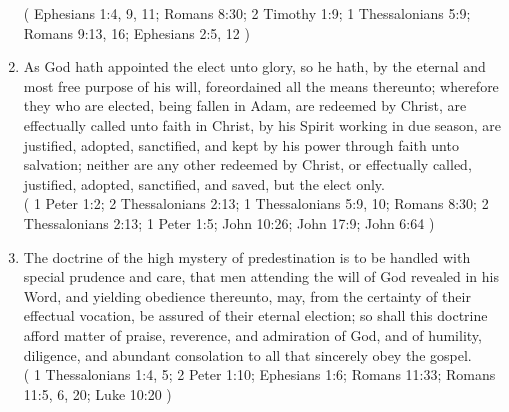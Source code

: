 \documentclass[12pt,a4paper]{book}
\begin{document}
\begin{enumerate}
( Ephesians 1:4, 9, 11; Romans 8:30; 2 Timothy 1:9; 1 Thessalonians 5:9; Romans 9:13, 16; Ephesians 2:5, 12 )
\item As God hath appointed the elect unto glory, so he hath, by the eternal and most free purpose of his will, foreordained all the means thereunto; wherefore they who are elected, being fallen in Adam, are redeemed by Christ, are effectually called unto faith in Christ, by his Spirit working in due season, are justified, adopted, sanctified, and kept by his power through faith unto salvation; neither are any other redeemed by Christ, or effectually called, justified, adopted, sanctified, and saved, but the elect only.\\
( 1 Peter 1:2; 2 Thessalonians 2:13; 1 Thessalonians 5:9, 10; Romans 8:30; 2 Thessalonians 2:13; 1 Peter 1:5; John 10:26; John 17:9; John 6:64 )
\item The doctrine of the high mystery of predestination is to be handled with special prudence and care, that men attending the will of God revealed in his Word, and yielding obedience thereunto, may, from the certainty of their effectual vocation, be assured of their eternal election; so shall this doctrine afford matter of praise, reverence, and admiration of God, and of humility, diligence, and abundant consolation to all that sincerely obey the gospel.\\
( 1 Thessalonians 1:4, 5; 2 Peter 1:10; Ephesians 1:6; Romans 11:33; Romans 11:5, 6, 20; Luke 10:20 )
\end{enumerate}
\end{document}
